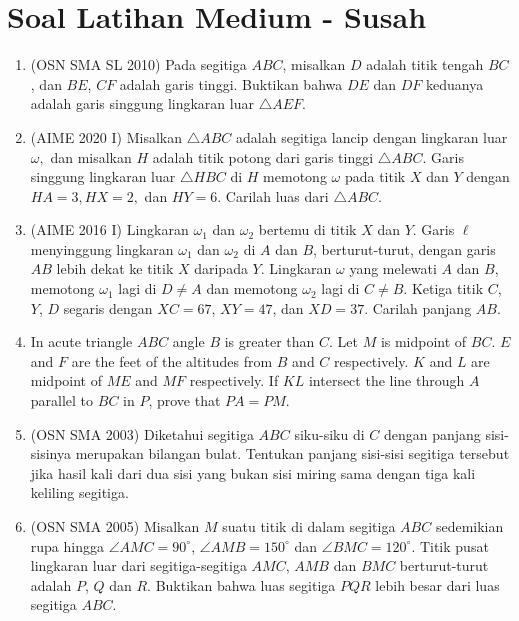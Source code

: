 \documentclass[12pt]{scrartcl}
\begin{document}
\section{Soal Latihan Medium - Susah}
\begin{enumerate}
    \item (OSN SMA SL 2010) Pada segitiga $ABC$, misalkan $D$ adalah titik tengah $BC$, dan $BE$, $CF$ adalah garis tinggi. Buktikan bahwa $DE$ dan $DF$ keduanya adalah garis singgung lingkaran luar $\triangle AEF$. %

    \item (AIME 2020 I) Misalkan $\triangle ABC$ adalah segitiga lancip dengan lingkaran luar $\omega,$ dan misalkan $H$ adalah titik potong dari garis tinggi $\triangle ABC.$ Garis singgung lingkaran luar $\triangle HBC$ di $H$ memotong $\omega$ pada titik $X$ dan $Y$ dengan $HA=3,HX=2,$ dan $HY=6.$ Carilah luas dari $\triangle ABC$.

    \item (AIME 2016 I) Lingkaran $\omega_1$ dan $\omega_2$ bertemu di titik $X$ dan $Y$. Garis $\ell$ menyinggung lingkaran $\omega_1$ dan $\omega_2$ di $A$ dan $B$, berturut-turut, dengan garis $AB$ lebih dekat ke titik $X$ daripada $Y$. Lingkaran $\omega$ yang melewati $A$ dan $B$, memotong $\omega_1$ lagi di $D \neq A$ dan memotong $\omega_2$ lagi di $C \neq B$. Ketiga titik $C$, $Y$, $D$ segaris dengan $XC = 67$, $XY = 47$, dan $XD = 37$. Carilah panjang $AB$.

    \item In acute triangle $ABC$ angle $B$ is greater than $C$. Let $M$ is midpoint of $BC$. $E$ and $F$ are the feet of the altitudes from $B$ and $C$ respectively. $K$ and $L$ are midpoint of $ME$ and $MF$ respectively. If $KL$ intersect the line through $A$ parallel to $BC$ in $P$, prove that $PA = PM$.
    
    \item (OSN SMA 2003) Diketahui segitiga $ABC$ siku-siku di $C$ dengan panjang sisi-sisinya merupakan bilangan bulat. Tentukan panjang sisi-sisi segitiga tersebut jika hasil kali dari dua sisi yang bukan sisi miring sama dengan tiga kali keliling segitiga.

    \item (OSN SMA 2005) Misalkan $M$ suatu titik di dalam segitiga $ABC$ sedemikian rupa hingga $\angle AMC = 90^\circ$, $\angle AMB = 150^\circ$ dan $\angle BMC = 120^\circ$. Titik pusat lingkaran luar dari segitiga-segitiga $AMC$, $AMB$ dan $BMC$ berturut-turut adalah $P$, $Q$ dan $R$. Buktikan bahwa luas segitiga $PQR$ lebih besar dari luas segitiga $ABC$.


\end{enumerate}
\end{document}
